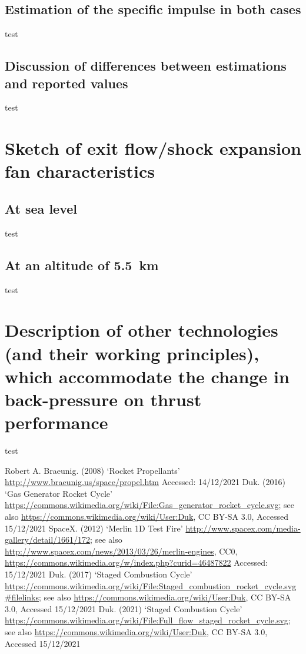 \documentclass[11pt]{article}
\numberwithin{equation}{section}
\begin{document}
\subsection{Estimation of the specific impulse in both cases}
test
\subsection{Discussion of differences between estimations and reported values}
test
\section{Sketch of exit flow/shock expansion fan characteristics}
\subsection{At sea level}
test
\subsection{At an altitude of \SI{5.5}{\kilo\meter}}
test
\section{Description of other technologies (and their working principles), which accommodate the change in back-pressure on thrust performance}
test
\begin{thebibliography}{00}
     Robert A. Braeunig. (2008) `Rocket Propellants' \url{http://www.braeunig.us/space/propel.htm} Accessed: 14/12/2021
     Duk. (2016) `Gas Generator Rocket Cycle' \url{https://commons.wikimedia.org/wiki/File:Gas_generator_rocket_cycle.svg}; see also \url{https://commons.wikimedia.org/wiki/User:Duk}, CC BY-SA 3.0, Accessed 15/12/2021
     SpaceX. (2012) `Merlin 1D Test Fire' \url{http://www.spacex.com/media-gallery/detail/1661/172}; see also \url{http://www.spacex.com/news/2013/03/26/merlin-engines}, CC0, \url{https://commons.wikimedia.org/w/index.php?curid=46487822} Accessed: 15/12/2021
     Duk. (2017) `Staged Combustion Cycle' \url{https://commons.wikimedia.org/wiki/File:Staged_combustion_rocket_cycle.svg#filelinks}; see also \url{https://commons.wikimedia.org/wiki/User:Duk}, CC BY-SA 3.0, Accessed 15/12/2021
     Duk. (2021) `Staged Combustion Cycle' \url{https://commons.wikimedia.org/wiki/File:Full_flow_staged_rocket_cycle.svg}; see also \url{https://commons.wikimedia.org/wiki/User:Duk}, CC BY-SA 3.0, Accessed 15/12/2021
\end{thebibliography}
\end{document}
